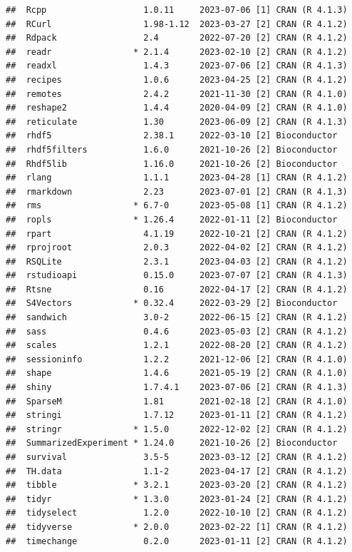 \documentclass[
]{book}
\begin{document}
\begin{verbatim}
##  Rcpp                   1.0.11     2023-07-06 [1] CRAN (R 4.1.3)
##  RCurl                  1.98-1.12  2023-03-27 [2] CRAN (R 4.1.2)
##  Rdpack                 2.4        2022-07-20 [2] CRAN (R 4.1.2)
##  readr                * 2.1.4      2023-02-10 [2] CRAN (R 4.1.2)
##  readxl                 1.4.3      2023-07-06 [2] CRAN (R 4.1.3)
##  recipes                1.0.6      2023-04-25 [2] CRAN (R 4.1.2)
##  remotes                2.4.2      2021-11-30 [2] CRAN (R 4.1.0)
##  reshape2               1.4.4      2020-04-09 [2] CRAN (R 4.1.0)
##  reticulate             1.30       2023-06-09 [2] CRAN (R 4.1.3)
##  rhdf5                  2.38.1     2022-03-10 [2] Bioconductor
##  rhdf5filters           1.6.0      2021-10-26 [2] Bioconductor
##  Rhdf5lib               1.16.0     2021-10-26 [2] Bioconductor
##  rlang                  1.1.1      2023-04-28 [1] CRAN (R 4.1.2)
##  rmarkdown              2.23       2023-07-01 [2] CRAN (R 4.1.3)
##  rms                  * 6.7-0      2023-05-08 [1] CRAN (R 4.1.2)
##  ropls                * 1.26.4     2022-01-11 [2] Bioconductor
##  rpart                  4.1.19     2022-10-21 [2] CRAN (R 4.1.2)
##  rprojroot              2.0.3      2022-04-02 [2] CRAN (R 4.1.2)
##  RSQLite                2.3.1      2023-04-03 [2] CRAN (R 4.1.2)
##  rstudioapi             0.15.0     2023-07-07 [2] CRAN (R 4.1.3)
##  Rtsne                  0.16       2022-04-17 [2] CRAN (R 4.1.2)
##  S4Vectors            * 0.32.4     2022-03-29 [2] Bioconductor
##  sandwich               3.0-2      2022-06-15 [2] CRAN (R 4.1.2)
##  sass                   0.4.6      2023-05-03 [2] CRAN (R 4.1.2)
##  scales                 1.2.1      2022-08-20 [2] CRAN (R 4.1.2)
##  sessioninfo            1.2.2      2021-12-06 [2] CRAN (R 4.1.0)
##  shape                  1.4.6      2021-05-19 [2] CRAN (R 4.1.0)
##  shiny                  1.7.4.1    2023-07-06 [2] CRAN (R 4.1.3)
##  SparseM                1.81       2021-02-18 [2] CRAN (R 4.1.0)
##  stringi                1.7.12     2023-01-11 [2] CRAN (R 4.1.2)
##  stringr              * 1.5.0      2022-12-02 [2] CRAN (R 4.1.2)
##  SummarizedExperiment * 1.24.0     2021-10-26 [2] Bioconductor
##  survival               3.5-5      2023-03-12 [2] CRAN (R 4.1.2)
##  TH.data                1.1-2      2023-04-17 [2] CRAN (R 4.1.2)
##  tibble               * 3.2.1      2023-03-20 [2] CRAN (R 4.1.2)
##  tidyr                * 1.3.0      2023-01-24 [2] CRAN (R 4.1.2)
##  tidyselect             1.2.0      2022-10-10 [2] CRAN (R 4.1.2)
##  tidyverse            * 2.0.0      2023-02-22 [1] CRAN (R 4.1.2)
##  timechange             0.2.0      2023-01-11 [2] CRAN (R 4.1.2)

\end{verbatim}
\end{document}
